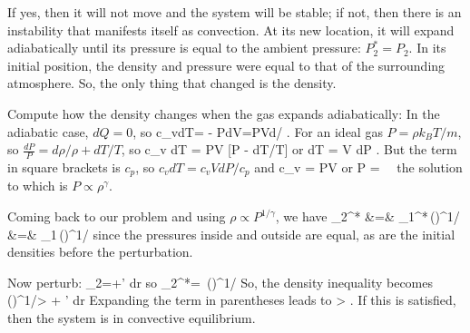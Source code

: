 \documentclass[11pt]{book}
\begin{document}
If yes, then it will not move and the system will be stable; if not, then there is an instability that manifests itself as convection. At its new location, it will expand adiabatically until its pressure is equal to the ambient pressure: $P_2^*=P_2$. In its initial position, the density and pressure were equal to that of the surrounding atmosphere. So, the only thing that changed is the density.


Compute how the density changes when the gas expands adiabatically:
In the adiabatic case, $dQ=0$, so 
\be
c_vdT= - PdV=PVd\rho/\rho
.\ee
For an ideal gas $P=\rho k_B T/m$, so $\frac{dP}P=d\rho/\rho +dT/T$, so 
\be
c_v dT  = PV [P - dT/T] \ee
or
\be
dT  = V dP
.\ee
But the term in square brackets is $c_p$, so $c_vdT= c_vVdP/c_p$ and
\be
c_v  = PV \ee
or
\be
{}P = \rho \, \equiv {}\rho \,\gamma\ee
%
the solution to which is $P\propto \rho^\gamma$.



Coming back to our problem and using $\rho\propto P^{1/\gamma}$, we have
\bea
\rho_2^* &=& \rho_1^*\,\left(\right)^{1/\gamma}
\vs
&=&
 \rho_1\,\left(\right)^{1/\gamma}\eea
 since the pressures inside and outside are equal, as are the initial densities before the perturbation.


Now perturb:
\be\rho_2=\rho+\rho' dr
\ee
so
\be
\rho_2^*= \rho \,\left(\right)^{1/\gamma}\ee
So, the density inequality becomes
\be
\rho \,\left(\right)^{1/\gamma}> \rho + \rho' dr\ee
Expanding the term in parentheses leads to
\be
{} > .
\ee
If this is satisfied, then the system is in convective equilibrium.

\end{document}
